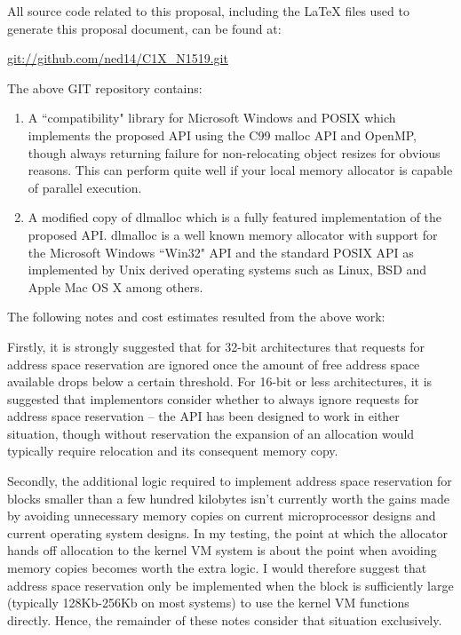 \documentclass[wd]{isov2}
\begin{document}
{
All source code related to this proposal, including the LaTeX files used to generate this proposal document, can be found at:
\begin{center}
\url{git://github.com/ned14/C1X_N1519.git}
\end{center}
The above GIT repository contains:
\begin{enumerate}
\item A ``compatibility" library for Microsoft Windows and POSIX which implements the proposed API using the C99 malloc API and OpenMP, though always returning failure for non-relocating object resizes for obvious reasons. This can perform quite well if your local memory allocator is capable of parallel execution.
\item A modified copy of dlmalloc  which is a fully featured implementation of the proposed API. dlmalloc is a well known memory allocator with support for the Microsoft Windows ``Win32" API and the standard POSIX API as implemented by Unix derived operating systems such as Linux, BSD and Apple Mac OS X among others.
\end{enumerate}
The following notes and cost estimates resulted from the above work:

Firstly, it is strongly suggested that for 32-bit architectures that requests for address space reservation are ignored once the amount of free address space available drops below a certain threshold. For 16-bit or less architectures, it is suggested that implementors consider whether to always ignore requests for address space reservation -- the API has been designed to work in either situation, though without reservation the expansion of an allocation would typically require relocation and its consequent memory copy.

Secondly, the additional logic required to implement address space reservation for blocks smaller than a few hundred kilobytes isn't currently worth the gains made by avoiding unnecessary memory copies on current microprocessor designs and current operating system designs. In my testing, the point at which the allocator hands off allocation to the kernel VM system is about the point when avoiding memory copies becomes worth the extra logic. I would therefore suggest that address space reservation only be implemented when the block is sufficiently large (typically 128Kb-256Kb on most systems) to use the kernel VM functions directly. Hence, the remainder of these notes consider that situation exclusively.

}
\end{document}
